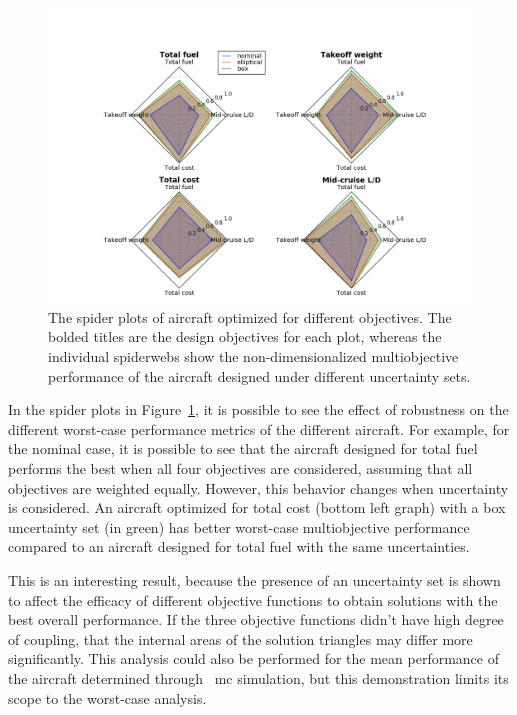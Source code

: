 \begin{figure}
    \includegraphics[trim={2cm 0 1cm 0},clip]{figures/4objradar.png}
    \caption{The spider plots of aircraft optimized for different objectives.
    The bolded titles are the design objectives for each plot, whereas the individual spiderwebs
    show the non-dimensionalized multiobjective performance of the aircraft designed under different
    uncertainty sets.}
    \label{fig:spider}
\end{figure}

In the spider plots in Figure~\ref{fig:spider}, it is possible to see the effect of robustness on
the different worst-case performance metrics of the different aircraft.
For example, for the nominal case, it is possible to see that
the aircraft designed for total fuel performs the best when all four objectives are considered,
assuming that all objectives are weighted equally.
However, this behavior changes when uncertainty is considered. An aircraft optimized for total cost
(bottom left graph) with a box uncertainty set (in green) has better worst-case multiobjective performance
compared to an aircraft designed for total fuel with the same uncertainties.

This is an interesting result, because the presence of an uncertainty set is
shown to affect the efficacy of different objective functions to obtain solutions
with the best overall performance. If the three objective functions didn't
have high degree of coupling, that the internal areas of the solution triangles may differ
more significantly. This analysis could also be performed for the mean performance
of the aircraft determined through ~\gls{mc} simulation, but this demonstration limits
its scope to the worst-case analysis.


